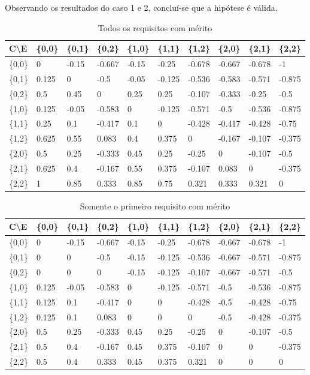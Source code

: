 \documentclass[preprint,12pt]{elsarticle}
\begin{document}
Observando os resultados do caso 1 e 2, concluí-se que a hipótese é válida.

\begin{table}[htp]
\caption{Todos os requisitos com mérito}
\label{table:merit-1-all}
\centering
\begin{tabular}{@{}llllllllll@{}}
\toprule
C\textbackslash E & \{0,0\} & \{0,1\} & \{0,2\} & \{1,0\} & \{1,1\} & \{1,2\} & \{2,0\} & \{2,1\} & \{2,2\} \\ \midrule
\{0,0\} & 0 & -0.15 & -0.667 & -0.15 & -0.25 & -0.678 & -0.667 & -0.678 & -1 \\
\{0,1\} & 0.125 & 0 & -0.5 & -0.05 & -0.125 & -0.536 & -0.583 & -0.571 & -0.875 \\
\{0,2\} & 0.5 & 0.45 & 0 & 0.25 & 0.25 & -0.107 & -0.333 & -0.25 & -0.5 \\
\{1,0\} & 0.125 & -0.05 & -0.583 & 0 & -0.125 & -0.571 & -0.5 & -0.536 & -0.875 \\
\{1,1\} & 0.25 & 0.1 & -0.417 & 0.1 & 0 & -0.428 & -0.417 & -0.428 & -0.75 \\
\{1,2\} & 0.625 & 0.55 & 0.083 & 0.4 & 0.375 & 0 & -0.167 & -0.107 & -0.375 \\
\{2,0\} & 0.5 & 0.25 & -0.333 & 0.45 & 0.25 & -0.25 & 0 & -0.107 & -0.5 \\
\{2,1\} & 0.625 & 0.4 & -0.167 & 0.55 & 0.375 & -0.107 & 0.083 & 0 & -0.375 \\
\{2,2\} & 1 & 0.85 & 0.333 & 0.85 & 0.75 & 0.321 & 0.333 & 0.321 & 0 \\
\bottomrule
\end{tabular}
\end{table}

\begin{table}[htp]
\caption{Somente o primeiro requisito com mérito}
\label{table:merit-0-and-1}
\centering
\begin{tabular}{@{}llllllllll@{}}
\toprule
C\textbackslash E & \{0,0\} & \{0,1\} & \{0,2\} & \{1,0\} & \{1,1\} & \{1,2\} & \{2,0\} & \{2,1\} & \{2,2\} \\ \midrule
\{0,0\} & 0 & -0.15 & -0.667 & -0.15 & -0.25 & -0.678 & -0.667 & -0.678 & -1 \\
\{0,1\} & 0 & 0 & -0.5 & -0.15 & -0.125 & -0.536 & -0.667 & -0.571 & -0.875 \\
\{0,2\} & 0 & 0 & 0 & -0.15 & -0.125 & -0.107 & -0.667 & -0.571 & -0.5 \\
\{1,0\} & 0.125 & -0.05 & -0.583 & 0 & -0.125 & -0.571 & -0.5 & -0.536 & -0.875 \\
\{1,1\} & 0.125 & 0.1 & -0.417 & 0 & 0 & -0.428 & -0.5 & -0.428 & -0.75 \\
\{1,2\} & 0.125 & 0.1 & 0.083 & 0 & 0 & 0 & -0.5 & -0.428 & -0.375 \\
\{2,0\} & 0.5 & 0.25 & -0.333 & 0.45 & 0.25 & -0.25 & 0 & -0.107 & -0.5 \\
\{2,1\} & 0.5 & 0.4 & -0.167 & 0.45 & 0.375 & -0.107 & 0 & 0 & -0.375 \\
\{2,2\} & 0.5 & 0.4 & 0.333 & 0.45 & 0.375 & 0.321 & 0 & 0 & 0 \\ \bottomrule
\end{tabular}
\end{table}
\end{document}
